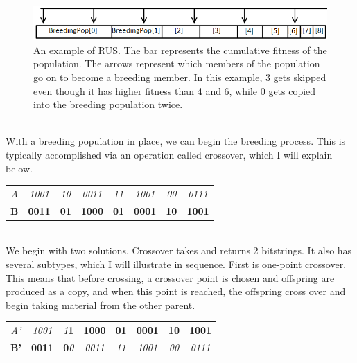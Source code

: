\begin{figure}
	\centering
	\includegraphics[width=0.7\linewidth]{figures/png/RUSIllustration}
	\caption[Roullete Uniform Selection]{An example of RUS. The bar represents the cumulative fitness of the population. The arrows represent which members of the population go on to become a breeding member.  In this example, 3 gets skipped even though it has higher fitness than 4 and 6, while 0 gets copied into the breeding population twice.}
	\label{fig:rusillustration}
	
\end{figure}
\\
With a breeding population in place, we can begin the breeding process.  This is typically accomplished via an operation called crossover, which I will explain below.  \\\begin{tabular}{c|c|c|c|c|c|c|c|}
	\textit{A} & \textit{1001} & \textit{10} & \textit{0011} & \textit{11} & \textit{1001} & \textit{00} & \textit{0111}\\ 
\textbf{B} & \textbf{0011} & \textbf{01} & \textbf{1000} & \textbf{01} & \textbf{0001} & \textbf{10} & \textbf{1001}\\
	
\end{tabular}\\
We begin with two solutions.  Crossover takes and returns 2 bitstrings.    It also has several subtypes, which I will illustrate in sequence.  First is one-point crossover.  This means that before crossing, a crossover point is chosen and offspring are produced as a copy, and when this point is reached, the offspring cross over and begin taking material from the other parent.  \\

\begin{tabular}{c|c|c|c|c|c|c|c|}
	\textit{A'} & \textit{1001} & \textit{1}\textbf{1} & \textbf{1000} & \textbf{01} & \textbf{0001} & \textbf{10} & \textbf{1001}\\ 
	\textbf{B'} & \textbf{0011} & \textbf{0}\textit{0} & \textit{0011} & \textit{11} & \textit{1001} & \textit{00} & \textit{0111}\\
	
\end{tabular}\\

